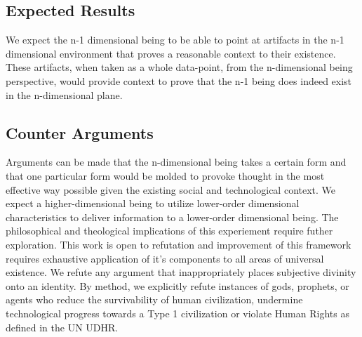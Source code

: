 \documentclass{article}
\begin{document}
\subsection{Expected Results}
We expect the n-1 dimensional being to be able to point at artifacts in the n-1 dimensional environment that proves a reasonable context to their existence.  These artifacts, when taken as a whole data-point, from the n-dimensional being perspective, would provide context to prove that the n-1 being does indeed exist in the n-dimensional plane.

\subsection{Counter Arguments}
Arguments can be made that the n-dimensional being takes a certain form and that one particular form would be molded to provoke thought in the most effective way possible given the existing social and technological context.  We expect a higher-dimensional being to utilize lower-order dimensional characteristics to deliver information to a lower-order dimensional being.  The philosophical and theological implications of this experiement require futher exploration.  This work is open to refutation and improvement of this framework requires exhaustive application of it's components to all areas of universal existence.  We refute any argument that inappropriately places subjective divinity onto an identity.  By method, we explicitly refute instances of gods, prophets, or agents who reduce the survivability of human civilization, undermine technological progress towards a Type 1 civilization or violate Human Rights as defined in the UN UDHR.
\end{document}
